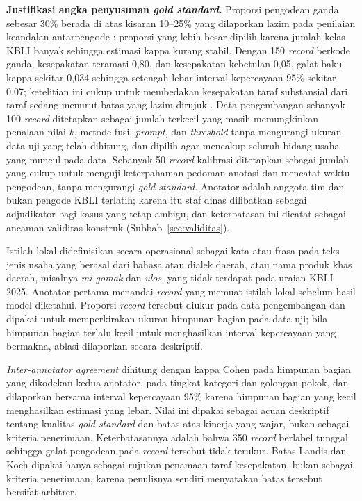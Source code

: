\textbf{Justifikasi angka penyusunan \textit{gold standard}.} Proporsi pengodean ganda sebesar 30\% berada di atas kisaran 10--25\% yang dilaporkan lazim pada penilaian keandalan antarpengode \cite{oconnor2020intercoder}; proporsi yang lebih besar dipilih karena jumlah kelas KBLI banyak sehingga estimasi kappa kurang stabil. Dengan 150 \textit{record} berkode ganda, kesepakatan teramati 0,80, dan kesepakatan kebetulan 0,05, galat baku kappa sekitar 0,034 sehingga setengah lebar interval kepercayaan 95\% sekitar 0,07; ketelitian ini cukup untuk membedakan kesepakatan taraf substansial dari taraf sedang menurut batas yang lazim dirujuk \cite{landis1977kappa}. Data pengembangan sebanyak 100 \textit{record} ditetapkan sebagai jumlah terkecil yang masih memungkinkan penalaan nilai $k$, metode fusi, \textit{prompt}, dan \textit{threshold} tanpa mengurangi ukuran data uji yang telah dihitung, dan dipilih agar mencakup seluruh bidang usaha yang muncul pada data. Sebanyak 50 \textit{record} kalibrasi ditetapkan sebagai jumlah yang cukup untuk menguji keterpahaman pedoman anotasi dan mencatat waktu pengodean, tanpa mengurangi \textit{gold standard}. Anotator adalah anggota tim dan bukan pengode KBLI terlatih; karena itu staf dinas dilibatkan sebagai adjudikator bagi kasus yang tetap ambigu, dan keterbatasan ini dicatat sebagai ancaman validitas konstruk (Subbab~\ref{sec:validitas}).

Istilah lokal didefinisikan secara operasional sebagai kata atau frasa pada teks jenis usaha yang berasal dari bahasa atau dialek daerah, atau nama produk khas daerah, misalnya \textit{mi gomak} dan \textit{ulos}, yang tidak terdapat pada uraian KBLI 2025. Anotator pertama menandai \textit{record} yang memuat istilah lokal sebelum hasil model diketahui. Proporsi \textit{record} tersebut diukur pada data pengembangan dan dipakai untuk memperkirakan ukuran himpunan bagian pada data uji; bila himpunan bagian terlalu kecil untuk menghasilkan interval kepercayaan yang bermakna, ablasi dilaporkan secara deskriptif.

\textit{Inter-annotator agreement} dihitung dengan kappa Cohen \cite{rainio2024evaluation} pada himpunan bagian yang dikodekan kedua anotator, pada tingkat kategori dan golongan pokok, dan dilaporkan bersama interval kepercayaan 95\% karena himpunan bagian yang kecil menghasilkan estimasi yang lebar. Nilai ini dipakai sebagai acuan deskriptif tentang kualitas \textit{gold standard} dan batas atas kinerja yang wajar, bukan sebagai kriteria penerimaan. Keterbatasannya adalah bahwa 350 \textit{record} berlabel tunggal sehingga galat pengodean pada \textit{record} tersebut tidak terukur. Batas Landis dan Koch \cite{landis1977kappa} dipakai hanya sebagai rujukan penamaan taraf kesepakatan, bukan sebagai kriteria penerimaan, karena penulisnya sendiri menyatakan batas tersebut bersifat arbitrer.

